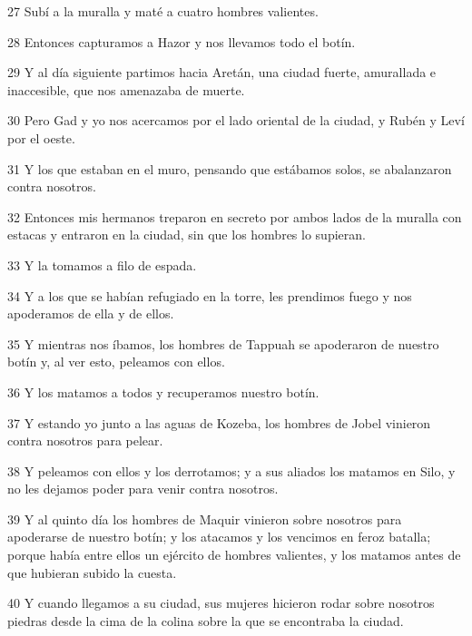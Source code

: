 \par 27 Subí a la muralla y maté a cuatro hombres valientes.

\par 28 Entonces capturamos a Hazor y nos llevamos todo el botín.

\par 29 Y al día siguiente partimos hacia Aretán, una ciudad fuerte, amurallada e inaccesible, que nos amenazaba de muerte.

\par 30 Pero Gad y yo nos acercamos por el lado oriental de la ciudad, y Rubén y Leví por el oeste.

\par 31 Y los que estaban en el muro, pensando que estábamos solos, se abalanzaron contra nosotros.

\par 32 Entonces mis hermanos treparon en secreto por ambos lados de la muralla con estacas y entraron en la ciudad, sin que los hombres lo supieran.

\par 33 Y la tomamos a filo de espada.

\par 34 Y a los que se habían refugiado en la torre, les prendimos fuego y nos apoderamos de ella y de ellos.

\par 35 Y mientras nos íbamos, los hombres de Tappuah se apoderaron de nuestro botín y, al ver esto, peleamos con ellos.

\par 36 Y los matamos a todos y recuperamos nuestro botín.

\par 37 Y estando yo junto a las aguas de Kozeba, los hombres de Jobel vinieron contra nosotros para pelear.

\par 38 Y peleamos con ellos y los derrotamos; y a sus aliados los matamos en Silo, y no les dejamos poder para venir contra nosotros.

\par 39 Y al quinto día los hombres de Maquir vinieron sobre nosotros para apoderarse de nuestro botín; y los atacamos y los vencimos en feroz batalla; porque había entre ellos un ejército de hombres valientes, y los matamos antes de que hubieran subido la cuesta.

\par 40 Y cuando llegamos a su ciudad, sus mujeres hicieron rodar sobre nosotros piedras desde la cima de la colina sobre la que se encontraba la ciudad.

